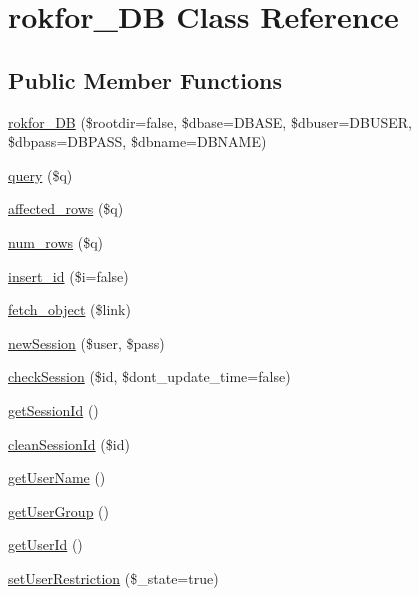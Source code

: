 \hypertarget{classrokfor___d_b}{
\section{rokfor\-\_\-\-D\-B \-Class \-Reference}
\label{classrokfor___d_b}
}
\subsection*{\-Public \-Member \-Functions}
\begin{DoxyCompactItemize}
\item 
\hyperlink{classrokfor___d_b_a024921bacc528922e69b4a7c18eb7088}{rokfor\-\_\-\-D\-B} (\$rootdir=false, \$dbase=\-D\-B\-A\-S\-E, \$dbuser=\-D\-B\-U\-S\-E\-R, \$dbpass=\-D\-B\-P\-A\-S\-S, \$dbname=\-D\-B\-N\-A\-M\-E)
\item 
\hyperlink{classrokfor___d_b_a881366691dcdfc3fd046b239c715c678}{query} (\$q)
\item 
\hyperlink{classrokfor___d_b_a7e86a52bf10ebddb935a49b1d96fa321}{affected\-\_\-rows} (\$q)
\item 
\hyperlink{classrokfor___d_b_af7750ae1b875d55abc718767da9bfd44}{num\-\_\-rows} (\$q)
\item 
\hyperlink{classrokfor___d_b_ad701de033e617b9723b6034493f60533}{insert\-\_\-id} (\$i=false)
\item 
\hyperlink{classrokfor___d_b_ac3176856eddeb02c4b0290f83c004549}{fetch\-\_\-object} (\$link)
\item 
\hyperlink{classrokfor___d_b_adbf04212e5e421b8c8769a8d23e8a29b}{new\-Session} (\$user, \$pass)
\item 
\hyperlink{classrokfor___d_b_aefd889b7b14b9f8c55cfe64726513702}{check\-Session} (\$id, \$dont\-\_\-update\-\_\-time=false)
\item 
\hyperlink{classrokfor___d_b_aa9889007e27fedadb28ae8f2fd77a569}{get\-Session\-Id} ()
\item 
\hyperlink{classrokfor___d_b_abd983ac3c514c5984d7dd7baede4c8ac}{clean\-Session\-Id} (\$id)
\item 
\hyperlink{classrokfor___d_b_aafd6d1ef27e6acc5833aba4012e5ee77}{get\-User\-Name} ()
\item 
\hyperlink{classrokfor___d_b_a51621a1c5a0e95942008cc6491342595}{get\-User\-Group} ()
\item 
\hyperlink{classrokfor___d_b_a05f6aa1ffae6295260d9f1cca016bf33}{get\-User\-Id} ()
\item 
\hyperlink{classrokfor___d_b_aa666d2cbd49e3f8feed14896773a3006}{set\-User\-Restriction} (\$\-\_\-state=true)

\end{DoxyCompactItemize}
